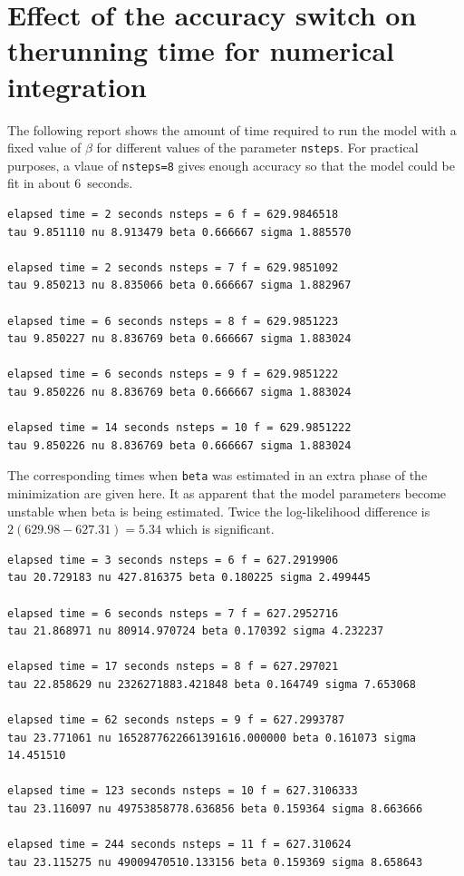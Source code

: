 \documentclass{admbmanual}
\begin{document}
\section{Effect of the accuracy switch on the\br running time for numerical integration}

The following report shows the amount of time required to run the model
with a fixed value of $\beta$ for different values of the
parameter \texttt{nsteps}. For practical purposes, a vlaue of \texttt{nsteps=8}
gives enough accuracy so that the model could be fit in about 6~seconds.
\begin{lstlisting}
elapsed time = 2 seconds nsteps = 6 f = 629.9846518
tau 9.851110 nu 8.913479 beta 0.666667 sigma 1.885570

elapsed time = 2 seconds nsteps = 7 f = 629.9851092
tau 9.850213 nu 8.835066 beta 0.666667 sigma 1.882967

elapsed time = 6 seconds nsteps = 8 f = 629.9851223
tau 9.850227 nu 8.836769 beta 0.666667 sigma 1.883024

elapsed time = 6 seconds nsteps = 9 f = 629.9851222
tau 9.850226 nu 8.836769 beta 0.666667 sigma 1.883024

elapsed time = 14 seconds nsteps = 10 f = 629.9851222
tau 9.850226 nu 8.836769 beta 0.666667 sigma 1.883024
\end{lstlisting}

The corresponding times when \texttt{beta} was estimated in an extra
phase of the minimization are given here. 
It as apparent that the model parameters become unstable when
beta is being estimated.  Twice the log-likelihood difference
is $2(629.98-627.31)=5.34$ which is significant.
\begin{lstlisting}
elapsed time = 3 seconds nsteps = 6 f = 627.2919906
tau 20.729183 nu 427.816375 beta 0.180225 sigma 2.499445

elapsed time = 6 seconds nsteps = 7 f = 627.2952716
tau 21.868971 nu 80914.970724 beta 0.170392 sigma 4.232237

elapsed time = 17 seconds nsteps = 8 f = 627.297021
tau 22.858629 nu 2326271883.421848 beta 0.164749 sigma 7.653068

elapsed time = 62 seconds nsteps = 9 f = 627.2993787
tau 23.771061 nu 1652877622661391616.000000 beta 0.161073 sigma 14.451510

elapsed time = 123 seconds nsteps = 10 f = 627.3106333
tau 23.116097 nu 49753858778.636856 beta 0.159364 sigma 8.663666

elapsed time = 244 seconds nsteps = 11 f = 627.310624
tau 23.115275 nu 49009470510.133156 beta 0.159369 sigma 8.658643
\end{lstlisting}
\end{document}

